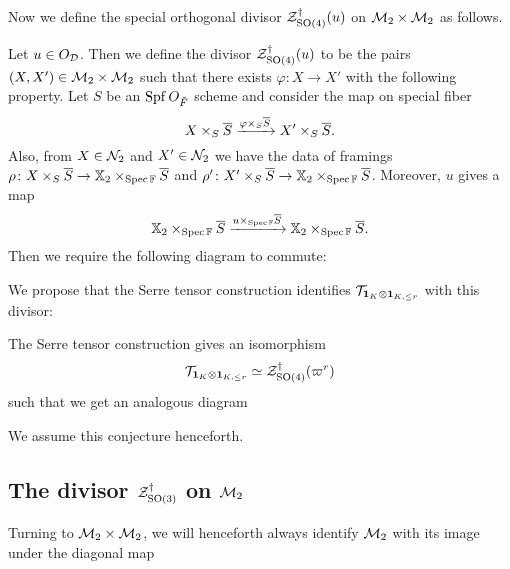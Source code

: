 Now we define the special orthogonal divisor $\mathcal Z^{\dagger}_{\operatorname{SO}(4)}(u)$
on $\mathcal M_2 \times \mathcal M_2$ as follows.
\begin{definition}
  Let $u \in O_\mathcal D$.
  Then we define the divisor $\mathcal Z^{\dagger}_{\operatorname{SO}(4)}(u)$ to be the pairs $(X, X') \in \mathcal M_2 \times \mathcal M_2$
  such that there exists $\varphi \colon X \to X'$ with the following property.
  Let $S$ be an $\operatorname{Spf} O_{\breve F}$ scheme and consider the map on special fiber
  \[ X \times_S \overline S \xrightarrow{\varphi \times_S \overline S} X' \times_S \overline S. \]
  Also, from $X \in \mathcal N_2$ and $X' \in \mathcal N_2$ we have the data of framings
  $\rho \colon X \times_S \overline S \to \mathbb X_2 \times_{\operatorname{Spec} \mathbb F} \overline S$
  and $\rho' \colon X' \times_S \overline S \to \mathbb X_2 \times_{\operatorname{Spec} \mathbb F} \overline S$.
  Moreover, $u$ gives a map
  \[
    \mathbb X_2 \times_{\operatorname{Spec} \mathbb F} \overline S
    \xrightarrow{u \times _{\operatorname{Spec} \mathbb F} \overline S}
    \mathbb X_2 \times_{\operatorname{Spec} \mathbb F} \overline S.
  \]
  Then we require the following diagram to commute:
  \begin{center}
  \end{center}
\end{definition}
We propose that the Serre tensor construction identifies $\mathcal{T}_{\mathbf{1}_K \otimes \mathbf{1}_{K, \le r}}$ with this divisor:
\begin{conjecture}
  \label{conj:serre_pullback_space}
  The Serre tensor construction gives an isomorphism
  \[ \mathcal{T}_{\mathbf{1}_K \otimes \mathbf{1}_{K, \le r}} \simeq \mathcal Z^{\dagger}_{\operatorname{SO}(4)}(\varpi^r) \]
  such that we get an analogous diagram
  \begin{center}
  \end{center}
\end{conjecture}
We assume this conjecture henceforth.

\subsection{The divisor $\mathcal Z^{\dagger}_{\operatorname{SO}(3)}$ on $\mathcal M_2$}
Turning to $\mathcal M_2 \times \mathcal M_2$, we will henceforth always identify $\mathcal M_2$
with its image under the diagonal map
\begin{center}
\end{center}

